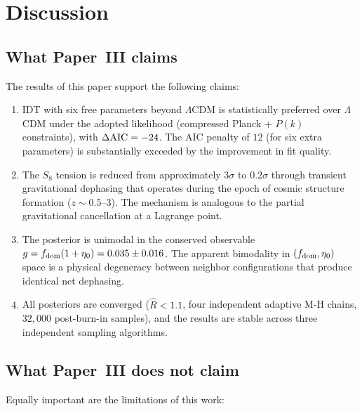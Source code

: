\documentclass[aps,prd,twocolumn,superscriptaddress,nofootinbib]{revtex4-2}
\newcommand{\fdom}{f_{\rm dom}}
\newcommand{\dAIC}{\Delta{\rm AIC}}
\newcommand{\etaz}{\eta_0}
\newcommand{\Rhat}{\hat{R}}
\begin{document}
\section{Discussion}
\label{sec:discussion}

\subsection{What Paper~III claims}
\label{sec:claims}

The results of this paper support the following claims:

\begin{enumerate}
\item IDT with six free parameters beyond $\Lambda$CDM is
  statistically preferred over $\Lambda$CDM under the adopted
  likelihood (compressed Planck + $P(k)$ constraints), with
  $\dAIC = -24$. The AIC penalty of $12$ (for six extra parameters)
  is substantially exceeded by the improvement in fit quality.
\item The $S_8$ tension is reduced from approximately $3\sigma$ to
  $0.2\sigma$ through transient gravitational dephasing that operates
  during the epoch of cosmic structure formation ($z \sim 0.5$--$3$).
  The mechanism is analogous to the partial gravitational
  cancellation at a Lagrange point.
\item The posterior is unimodal in the conserved observable
  $g = \fdom(1 + \etaz) = 0.035 \pm 0.016$. The apparent bimodality
  in $(\fdom, \etaz)$ space is a physical degeneracy between neighbor
  configurations that produce identical net dephasing.
\item All posteriors are converged ($\Rhat < 1.1$, four independent
  adaptive M-H chains, $32{,}000$ post-burn-in samples), and the
  results are stable across three independent sampling algorithms.
\end{enumerate}

\subsection{What Paper~III does not claim}
\label{sec:non_claims}

Equally important are the limitations of this work:
\end{document}
